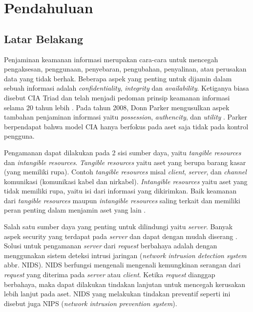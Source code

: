 \chapter{Pendahuluan}


\section{Latar Belakang}

  Penjaminan keamanan informasi merupakan cara-cara untuk mencegah pengaksesan, penggunaan, penyebaran, pengubahan, penyalinan, atau perusakan data yang tidak berhak. Beberapa aspek yang penting untuk dijamin dalam sebuah informasi adalah \emph{confidentiality}, \emph{integrity} dan \emph{availability}. Ketiganya biasa disebut CIA Triad dan telah menjadi pedoman prinsip keamanan informasi selama 20 tahun lebih \citep{nist2003}. Pada tahun 2008, Donn Parker mengusulkan aspek tambahan penjaminan informasi yaitu \emph{possession}, \emph{authencity}, dan \emph{utility} \citep{parker1998}. Parker berpendapat bahwa model CIA hanya berfokus pada aset saja tidak pada kontrol pengguna.

  Pengamanan dapat dilakukan pada 2 sisi sumber daya, yaitu \emph{tangible resources} dan \emph{intangible resources}. \emph{Tangible resources} yaitu aset yang berupa barang kasar (yang memiliki rupa). Contoh \emph{tangible resources} misal \emph{client}, \emph{server}, dan \emph{channel} komunikasi (komunikasi kabel dan nirkabel). \emph{Intangible resources} yaitu aset yang tidak memiliki rupa, yaitu isi dari informasi yang dikirimkan. Baik keamanan dari \emph{tangible resources} maupun \emph{intangible resources} saling terkait dan memiliki peran penting dalam menjamin aset yang lain \citep{kizza2015}.

  Salah satu sumber daya yang penting untuk dilindungi yaitu \emph{server}. Banyak aspek security yang terdapat pada \emph{server} dan dapat dengan mudah diserang \citep{owasp}. Solusi untuk pengamanan \emph{server} dari \emph{request} berbahaya adalah dengan menggunakan sistem deteksi intrusi jaringan (\emph{network intrusion detection system} abbr. NIDS). NIDS berfungsi mengenali mengenali kemungkinan serangan dari \emph{request} yang diterima pada \emph{server} atau \emph{client}. Ketika \emph{request} dianggap berbahaya, maka dapat dilakukan tindakan lanjutan untuk mencegah kerusakan lebih lanjut pada aset. NIDS yang melakukan tindakan preventif seperti ini disebut juga NIPS (\emph{network intrusion prevention system}).

